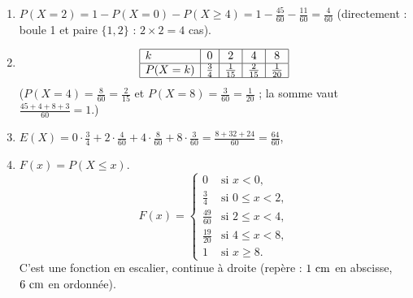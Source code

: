\begin{enumerate}
\begin{enumerate}
            $X = 4$ : (boule 1 de $U_1$ et paire $\{2,2\}$) : $2 \times 1 = 2$ cas ; (boule 2 et paire $\{1,2\}$) : $3 \times 2 = 6$ cas.
            $X = 8$ : boule 2 et paire $\{2,2\}$ : $3 \times 1 = 3$ cas.
            Donc $P(X \geq 4) = \frac{2 + 6 + 3}{60}$, 
         \item {}
            $P(X = 2) = 1 - P(X = 0) - P(X \geq 4) = 1 - \frac{45}{60} - \frac{11}{60} = \frac{4}{60}$
            (directement : boule 1 et paire $\{1,2\}$ : $2 \times 2 = 4$ cas). 
         \item {}
            \[
               \begin{array}{|l|c|c|c|c|}
                  \hline
                  k & 0 & 2 & 4 & 8 \\ \hline
                  P(X = k) & \frac{3}{4} & \frac{1}{15} & \frac{2}{15} & \frac{1}{20} \\ \hline
               \end{array}
            \]
            ($P(X = 4) = \frac{8}{60} = \frac{2}{15}$ et $P(X = 8) = \frac{3}{60} = \frac{1}{20}$ ; la somme vaut $\frac{45 + 4 + 8 + 3}{60} = 1$.)
         \item {}
            $E(X) = 0 \cdot \frac{3}{4} + 2 \cdot \frac{4}{60} + 4 \cdot \frac{8}{60} + 8 \cdot \frac{3}{60} = \frac{8 + 32 + 24}{60} = \frac{64}{60}$,
            \par\noindent{}
         \item {} $F(x) = P(X \leq x)$.
            \[
               F(x) = \begin{cases}
                  0 & \text{si } x < 0, \\
                  \frac{3}{4} & \text{si } 0 \leq x < 2, \\
                  \frac{49}{60} & \text{si } 2 \leq x < 4, \\
                  \frac{19}{20} & \text{si } 4 \leq x < 8, \\
                  1 & \text{si } x \geq 8.
               \end{cases}
            \]
            C'est une fonction en escalier, continue \`a droite (rep\`ere : $1~\mathrm{cm}$ en abscisse, $6~\mathrm{cm}$ en ordonn\'ee).
            \begin{center}
\end{center}
\end{enumerate}
\end{enumerate}
